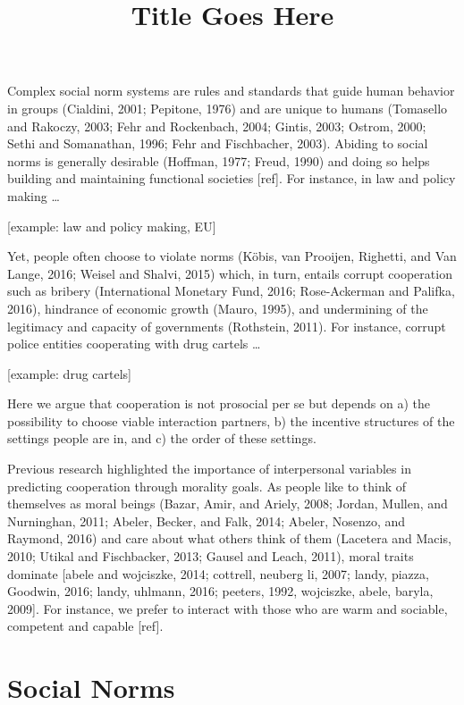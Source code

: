 \documentclass[man, 12pt, a4paper]{apa6}
\title{Title Goes Here}
\begin{document}

\maketitle

Complex social norm systems are rules and standards that guide human behavior in groups (Cialdini, 2001; Pepitone, 1976) and are unique to humans (Tomasello and Rakoczy, 2003; Fehr and Rockenbach, 2004; Gintis, 2003; Ostrom, 2000; Sethi and Somanathan, 1996; Fehr and Fischbacher, 2003). Abiding to social norms is generally desirable (Hoffman, 1977; Freud, 1990) and doing so helps building and maintaining functional societies [ref]. For instance, in law and policy making … 

[example: law and policy making, EU]

Yet, people often choose to violate norms (Köbis, van Prooijen, Righetti, and Van Lange, 2016; Weisel and Shalvi, 2015) which, in turn, entails corrupt cooperation such as bribery (International Monetary Fund, 2016; Rose-Ackerman and Palifka, 2016), hindrance of economic growth (Mauro, 1995), and undermining of the legitimacy and capacity of governments (Rothstein, 2011). For instance, corrupt police entities cooperating with drug cartels … 

[example: drug cartels]

Here we argue that cooperation is not prosocial per se but depends on a) the possibility to choose viable interaction partners, b) the incentive structures of the settings people are in, and c) the order of these settings. 

Previous research highlighted the importance of interpersonal variables in predicting cooperation through morality goals. As people like to think of themselves as moral beings (Bazar, Amir, and Ariely, 2008; Jordan, Mullen, and Nurninghan, 2011; Abeler, Becker, and Falk, 2014; Abeler, Nosenzo, and Raymond, 2016) and care about what others think of them (Lacetera and Macis, 2010; Utikal and Fischbacker, 2013; Gausel and Leach, 2011), moral traits dominate [abele and wojciszke, 2014; cottrell, neuberg li, 2007; landy, piazza, Goodwin, 2016; landy, uhlmann, 2016; peeters, 1992, wojciszke, abele, baryla, 2009]. For instance, we prefer to interact with those who are warm and sociable, competent and capable [ref]. 


\section{Social Norms}
\end{document}
